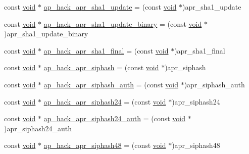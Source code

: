 \begin{DoxyCompactItemize}
\item 
const \hyperlink{group__MOD__ISAPI_gacd6cdbf73df3d9eed42fa493d9b621a6}{void} $\ast$ \hyperlink{srclib_2apr-util_2exports_8c_af1357d84b35751ab3297e707b45e35be}{ap\+\_\+hack\+\_\+apr\+\_\+sha1\+\_\+update} = (const \hyperlink{group__MOD__ISAPI_gacd6cdbf73df3d9eed42fa493d9b621a6}{void} $\ast$)apr\+\_\+sha1\+\_\+update
\item 
const \hyperlink{group__MOD__ISAPI_gacd6cdbf73df3d9eed42fa493d9b621a6}{void} $\ast$ \hyperlink{srclib_2apr-util_2exports_8c_a5717f998676e6d4b783edd76e4fc37b8}{ap\+\_\+hack\+\_\+apr\+\_\+sha1\+\_\+update\+\_\+binary} = (const \hyperlink{group__MOD__ISAPI_gacd6cdbf73df3d9eed42fa493d9b621a6}{void} $\ast$)apr\+\_\+sha1\+\_\+update\+\_\+binary
\item 
const \hyperlink{group__MOD__ISAPI_gacd6cdbf73df3d9eed42fa493d9b621a6}{void} $\ast$ \hyperlink{srclib_2apr-util_2exports_8c_aa77c3a112f4a62ad941b030186dbb142}{ap\+\_\+hack\+\_\+apr\+\_\+sha1\+\_\+final} = (const \hyperlink{group__MOD__ISAPI_gacd6cdbf73df3d9eed42fa493d9b621a6}{void} $\ast$)apr\+\_\+sha1\+\_\+final
\item 
const \hyperlink{group__MOD__ISAPI_gacd6cdbf73df3d9eed42fa493d9b621a6}{void} $\ast$ \hyperlink{srclib_2apr-util_2exports_8c_a634d2da60941f1d0451df7ff5695de5e}{ap\+\_\+hack\+\_\+apr\+\_\+siphash} = (const \hyperlink{group__MOD__ISAPI_gacd6cdbf73df3d9eed42fa493d9b621a6}{void} $\ast$)apr\+\_\+siphash
\item 
const \hyperlink{group__MOD__ISAPI_gacd6cdbf73df3d9eed42fa493d9b621a6}{void} $\ast$ \hyperlink{srclib_2apr-util_2exports_8c_a050274acb623d8ecb50a4fbdbcb3cbef}{ap\+\_\+hack\+\_\+apr\+\_\+siphash\+\_\+auth} = (const \hyperlink{group__MOD__ISAPI_gacd6cdbf73df3d9eed42fa493d9b621a6}{void} $\ast$)apr\+\_\+siphash\+\_\+auth
\item 
const \hyperlink{group__MOD__ISAPI_gacd6cdbf73df3d9eed42fa493d9b621a6}{void} $\ast$ \hyperlink{srclib_2apr-util_2exports_8c_a0c8c92c35d8285e29d96d7b41817227b}{ap\+\_\+hack\+\_\+apr\+\_\+siphash24} = (const \hyperlink{group__MOD__ISAPI_gacd6cdbf73df3d9eed42fa493d9b621a6}{void} $\ast$)apr\+\_\+siphash24
\item 
const \hyperlink{group__MOD__ISAPI_gacd6cdbf73df3d9eed42fa493d9b621a6}{void} $\ast$ \hyperlink{srclib_2apr-util_2exports_8c_a06c526d69989cda55abbf330d3ac0cb4}{ap\+\_\+hack\+\_\+apr\+\_\+siphash24\+\_\+auth} = (const \hyperlink{group__MOD__ISAPI_gacd6cdbf73df3d9eed42fa493d9b621a6}{void} $\ast$)apr\+\_\+siphash24\+\_\+auth
\item 
const \hyperlink{group__MOD__ISAPI_gacd6cdbf73df3d9eed42fa493d9b621a6}{void} $\ast$ \hyperlink{srclib_2apr-util_2exports_8c_a28e037c7047a0a3b5ee59a94ba397370}{ap\+\_\+hack\+\_\+apr\+\_\+siphash48} = (const \hyperlink{group__MOD__ISAPI_gacd6cdbf73df3d9eed42fa493d9b621a6}{void} $\ast$)apr\+\_\+siphash48

\end{DoxyCompactItemize}
